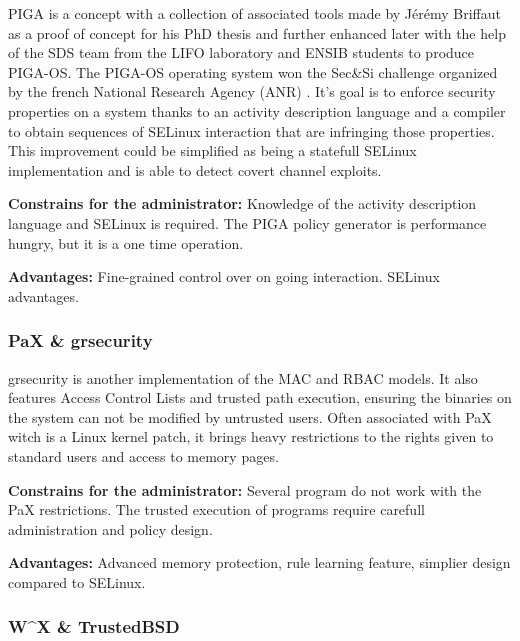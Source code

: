 \documentclass[pdftex,a4paper,titlepage,11pt]{article}
\begin{document}
PIGA is a concept with a collection of associated tools made by Jérémy Briffaut
as a proof of concept for his PhD thesis and further enhanced later with the
help of the SDS team from the LIFO laboratory and ENSIB students to produce
PIGA-OS. The PIGA-OS operating system won the Sec\&Si challenge organized by
the french National Research Agency (ANR) \cite{pigaosdefisecurite2011}
\cite{pigaproperty2010}. It's goal is to enforce security properties on a system
thanks to an activity description language and a compiler to obtain sequences of
SELinux interaction that are infringing those properties. This improvement could
be simplified as being a statefull SELinux implementation and is able to detect
covert channel exploits.

\begin{list}{}{}
	\item \textbf{Constrains for the administrator:} Knowledge of
the activity description language and SELinux is required. The PIGA policy
generator is performance hungry, but it is a one time operation.
	\item \textbf{Advantages:} Fine-grained control over on going interaction.
SELinux advantages.
\end{list}

\subsubsection{PaX \& grsecurity}

grsecurity \cite{grsecuritywebsite} is another implementation of the MAC and
RBAC models. It also features Access Control Lists and trusted path execution,
ensuring the binaries on the system can not be modified by untrusted users.
Often associated with PaX witch is a Linux kernel patch, it brings heavy
restrictions to the rights given to standard users and access to memory pages.

\begin{list}{}{}
	\item \textbf{Constrains for the administrator:} Several program do
not work with the PaX restrictions. The trusted execution of programs require
carefull administration and policy design.
	\item \textbf{Advantages:} Advanced memory protection, rule learning
feature, simplier design compared to SELinux.
\end{list}

\subsubsection{W\^{}X \& TrustedBSD}
\end{document}
